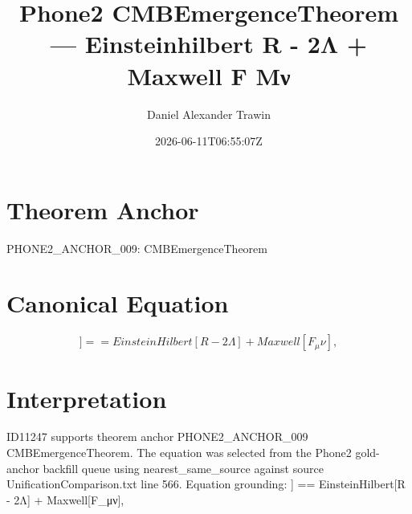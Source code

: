 \documentclass[11pt]{article}
\title{Phone2 CMBEmergenceTheorem — Einsteinhilbert R - 2Λ + Maxwell F Μν}
\author{Daniel Alexander Trawin}
\date{2026-06-11T06:55:07Z}
\begin{document}
\maketitle
\section*{Theorem Anchor}
PHONE2_ANCHOR_009: CMBEmergenceTheorem
\section*{Canonical Equation}
\[
] == EinsteinHilbert[R - 2Λ] + Maxwell[F_μν],
\]
\section*{Interpretation}
ID11247 supports theorem anchor PHONE2_ANCHOR_009 CMBEmergenceTheorem. The equation was selected from the Phone2 gold-anchor backfill queue using nearest_same_source against source UnificationComparison.txt line 566. Equation grounding: ] == EinsteinHilbert[R - 2Λ] + Maxwell[F_μν],
\end{document}

